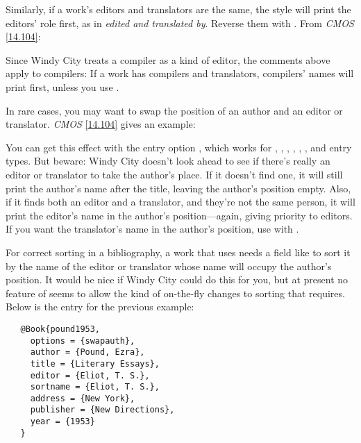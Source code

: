 \documentclass[11pt,letterpaper,oneside]{article}
\begin{document}
Similarly, if a work's editors and translators are the same, the style
will print the editors' role first, as in \textit{edited and
translated by}. Reverse them with . From \textit{CMOS}
\ref{14.104}:

\begin{citebib}
\item \cite{menchu1999}
\end{citebib}

Since Windy City treats a compiler as a kind of editor, the comments
above apply to compilers: If a work has compilers and translators,
compilers' names will print first, unless you use .

In rare cases, you may want to swap the position of an author and an
editor or translator. \textit{CMOS} \ref{14.104} gives an example:

\begin{citebib}
\item \cite{pound1953}
\end{citebib}

\noindent You can get this effect with the entry option
, which works for , ,
, , ,
, and  entry types. But beware:
Windy City doesn't look ahead to see if there's really an editor or
translator to take the author's place. If it doesn't find one, it will
still print the author's name after the title, leaving the author's
position empty. Also, if it finds both an editor and a translator, and
they're not the same person, it will print the editor's name in the
author's position---again, giving priority to editors. If you want the
translator's name in the author's position, use  with
.

For correct sorting in a bibliography, a work that uses 
needs a field like  to sort it by the name of the
editor or translator whose name will occupy the author's position. It
would be nice if Windy City could do this for you, but at present no
feature of \biblatex seems to allow the kind of on-the-fly changes to
sorting that  requires. Below is the entry for the
previous example:

\begin{verbatim}
   @Book{pound1953,
     options = {swapauth},
     author = {Pound, Ezra},
     title = {Literary Essays},
     editor = {Eliot, T. S.},
     sortname = {Eliot, T. S.},
     address = {New York},
     publisher = {New Directions},
     year = {1953}
   }
\end{verbatim}
\end{document}
